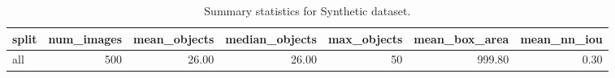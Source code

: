 \begin{table}
\caption{Summary statistics for Synthetic dataset.}
\label{tab:synth_summary}
\begin{tabular}{lrrrrrr}
\toprule
split & num_images & mean_objects & median_objects & max_objects & mean_box_area & mean_nn_iou \\
\midrule
all & 500 & 26.00 & 26.00 & 50 & 999.80 & 0.30 \\
\bottomrule
\end{tabular}
\end{table}
